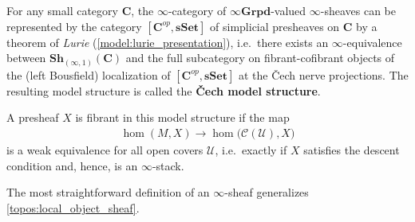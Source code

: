    \begin{property}\label{topos:cech_model_structure}
        For any small category $\mathbf{C}$, the $\infty$-category of $\infty\mathbf{Grpd}$-valued $\infty$-sheaves can be represented by the category $[\mathbf{C}^{op},\mathbf{sSet}]$ of simplicial presheaves on $\mathbf{C}$ by a theorem of \textit{Lurie} (\cref{model:lurie_presentation}), i.e.~there exists an $\infty$-equivalence between $\mathbf{Sh}_{(\infty,1)}(\mathbf{C})$ and the full subcategory on fibrant-cofibrant objects of the (left Bousfield) localization of $[\mathbf{C}^{op},\mathbf{sSet}]$ at the \v{C}ech nerve projections. The resulting model structure is called the \textbf{\v{C}ech model structure}.

        A presheaf $X$ is fibrant in this model structure if the map
        \begin{gather}
            \hom(M,X)\rightarrow\hom\bigl(\mathcal{C}(\mathcal{U}),X\bigr)
        \end{gather}
        is a weak equivalence for all open covers $\mathcal{U}$, i.e.~exactly if $X$ satisfies the descent condition and, hence, is an $\infty$-stack.
    \end{property}

    The most straightforward definition of an $\infty$-sheaf generalizes \cref{topos:local_object_sheaf}.

